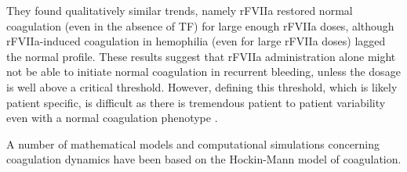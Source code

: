 \documentclass[processes,article,received,moreauthors,pdftex,12pt,a4paper]{mdpi}
\begin{document}
They found qualitatively similar trends, namely rFVIIa restored normal coagulation (even in the absence of TF) for large enough rFVIIa doses, although rFVIIa-induced coagulation 
in hemophilia (even for large rFVIIa doses) lagged the normal profile. 
These results suggest that rFVIIa administration alone
might not be able to initiate normal coagulation in recurrent bleeding, unless the dosage is well above a critical threshold.
However, defining this threshold, which is likely patient specific, is difficult as there is tremendous patient to patient variability even with a normal
coagulation phenotype \citep{Danforth:2012aa}. 

A number of mathematical models and computational simulations concerning coagulation dynamics have been based on the Hockin-Mann model of coagulation. 
\end{document}

